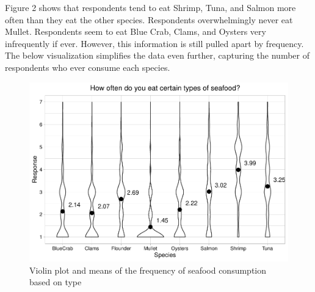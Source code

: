\documentclass[
  12pt,
]{article}
\begin{document}
Figure 2 shows that respondents tend to eat Shrimp, Tuna, and Salmon
more often than they eat the other species. Respondents overwhelmingly
never eat Mullet. Respondents seem to eat Blue Crab, Clams, and Oysters
very infrequently if ever. However, this information is still pulled
apart by frequency. The below visualization simplifies the data even
further, capturing the number of respondents who ever consume each
species.

\begin{figure}
\centering
\includegraphics{Final_rmd_files/figure-latex/freq violin-1.pdf}
\caption{Violin plot and means of the frequency of seafood consumption
based on type}
\end{figure}
\end{document}
